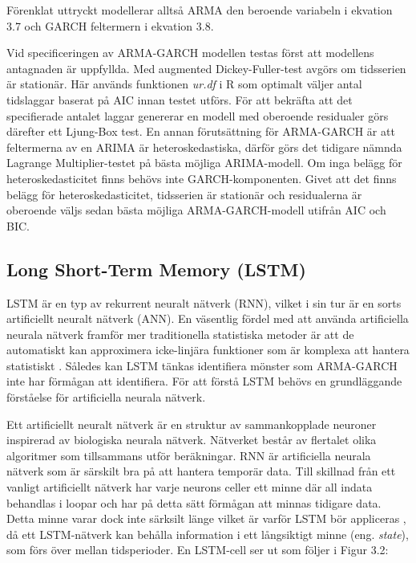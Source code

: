 \documentclass[11pt]{article}
\numberwithin{equation}{section}
\numberwithin{table}{section}
\numberwithin{figure}{section}
\begin{document}
Förenklat uttryckt modellerar alltså ARMA den beroende variabeln i ekvation 3.7 och GARCH feltermern i ekvation 3.8. 

Vid specificeringen av ARMA-GARCH modellen testas först att modellens antagnaden är uppfyllda. Med augmented Dickey-Fuller-test avgörs om tidsserien är stationär. Här används funktionen \textit{ur.df} i R som optimalt väljer antal tidslaggar baserat på AIC innan testet utförs.  För att bekräfta att det specifierade antalet laggar genererar en modell med oberoende residualer görs därefter ett Ljung-Box test. En annan förutsättning för ARMA-GARCH är att feltermerna av en ARIMA är heteroskedastiska, därför görs det tidigare nämnda Lagrange Multiplier-testet på bästa möjliga ARIMA-modell. Om inga belägg för heteroskedasticitet finns behövs inte GARCH-komponenten. Givet att det finns belägg för heteroskedasticitet, tidsserien är stationär och residualerna är oberoende väljs sedan bästa möjliga ARMA-GARCH-modell utifrån AIC och BIC. 


\subsection{Long Short-Term Memory (LSTM)}
LSTM är en typ av rekurrent neuralt nätverk (RNN), vilket i sin tur är en sorts artificiellt neuralt nätverk (ANN). En väsentlig fördel med att använda artificiella neurala nätverk framför mer traditionella statistiska metoder är att de automatiskt kan approximera icke-linjära funktioner som är komplexa att hantera statistiskt \parencite{paliwal2009neural}. Således kan LSTM tänkas identifiera mönster som ARMA-GARCH inte har förmågan att identifiera.  För att förstå LSTM behövs en grundläggande förståelse för artificiella neurala nätverk. 

Ett artificiellt neuralt nätverk är en struktur av sammankopplade neuroner inspirerad av biologiska neurala nätverk. Nätverket består av flertalet olika algoritmer som tillsammans utför beräkningar. RNN är artificiella neurala nätverk som är särskilt bra på att hantera temporär data. Till skillnad från ett vanligt artificiellt nätverk har varje neurons celler ett minne där all indata behandlas i loopar och har på detta sätt förmågan att minnas tidigare data. Detta minne varar dock inte särksilt länge vilket är varför LSTM bör appliceras \parencite[][,s.478-559]{purkait2019hands}, då ett LSTM-nätverk kan behålla information i ett långsiktigt minne (eng. \textit{state}), som förs över mellan tidsperioder. En LSTM-cell ser ut som följer i Figur 3.2:
\end{document}
